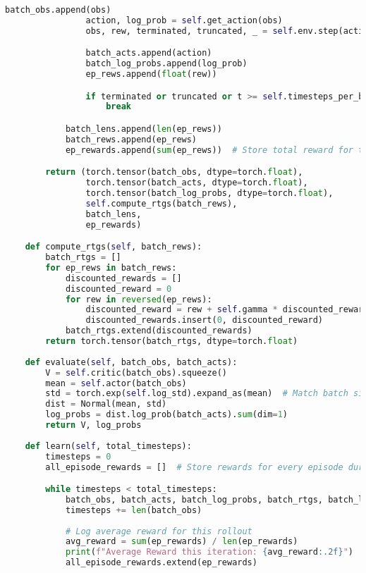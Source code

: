 \documentclass[12pt]{extreport} %
\begin{document}
\begin{lstlisting}[language=Python, caption={PPO Implementation (ppo.py)}, label={code:ppo}]
                batch_obs.append(obs)
                action, log_prob = self.get_action(obs)
                obs, rew, terminated, truncated, _ = self.env.step(action)

                batch_acts.append(action)
                batch_log_probs.append(log_prob)
                ep_rews.append(float(rew))

                if terminated or truncated or t >= self.timesteps_per_batch:
                    break

            batch_lens.append(len(ep_rews))
            batch_rews.append(ep_rews)
            ep_rewards.append(sum(ep_rews))  # Store total reward for this episode

        return (torch.tensor(batch_obs, dtype=torch.float),
                torch.tensor(batch_acts, dtype=torch.float),
                torch.tensor(batch_log_probs, dtype=torch.float),
                self.compute_rtgs(batch_rews),
                batch_lens,
                ep_rewards)

    def compute_rtgs(self, batch_rews):
        batch_rtgs = []
        for ep_rews in batch_rews:
            discounted_rewards = []
            discounted_reward = 0
            for rew in reversed(ep_rews):
                discounted_reward = rew + self.gamma * discounted_reward
                discounted_rewards.insert(0, discounted_reward)
            batch_rtgs.extend(discounted_rewards)
        return torch.tensor(batch_rtgs, dtype=torch.float)
    
    def evaluate(self, batch_obs, batch_acts):
        V = self.critic(batch_obs).squeeze()
        mean = self.actor(batch_obs)
        std = torch.exp(self.log_std).expand_as(mean)  # Match batch size
        dist = Normal(mean, std)
        log_probs = dist.log_prob(batch_acts).sum(dim=1)
        return V, log_probs
    
    def learn(self, total_timesteps):
        timesteps = 0
        all_episode_rewards = []  # Store rewards for every episode during training

        while timesteps < total_timesteps:
            batch_obs, batch_acts, batch_log_probs, batch_rtgs, batch_lens, ep_rewards = self.rollout()
            timesteps += len(batch_obs)
            
            # Log average reward for this rollout
            avg_reward = sum(ep_rewards) / len(ep_rewards)
            print(f"Average Reward this iteration: {avg_reward:.2f}")
            all_episode_rewards.extend(ep_rewards)
            

\end{lstlisting}
\end{document}
